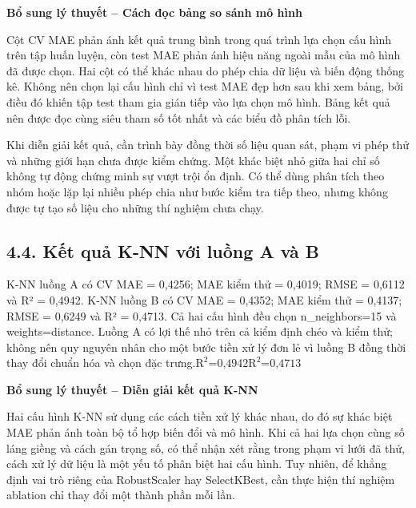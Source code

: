 \documentclass[12pt,a4paper,oneside]{article}
\begin{document}
\par\noindent\textbf{Bổ sung lý thuyết -- Cách đọc bảng so sánh mô hình}\par
Cột CV MAE phản ánh kết quả trung bình trong quá trình lựa chọn cấu hình trên tập huấn luyện, còn test MAE phản ánh hiệu năng ngoài mẫu của mô hình đã được chọn. Hai cột có thể khác nhau do phép chia dữ liệu và biến động thống kê. Không nên chọn lại cấu hình chỉ vì test MAE đẹp hơn sau khi xem bảng, bởi điều đó khiến tập test tham gia gián tiếp vào lựa chọn mô hình. Bảng kết quả nên được đọc cùng siêu tham số tốt nhất và các biểu đồ phân tích lỗi.\par

Khi diễn giải kết quả, cần trình bày đồng thời số liệu quan sát, phạm vi phép thử và những giới hạn chưa được kiểm chứng. Một khác biệt nhỏ giữa hai chỉ số không tự động chứng minh sự vượt trội ổn định. Có thể dùng phân tích theo nhóm hoặc lặp lại nhiều phép chia như bước kiểm tra tiếp theo, nhưng không được tự tạo số liệu cho những thí nghiệm chưa chạy.\par

\subsection*{4.4. Kết quả K-NN với luồng A và B}

K-NN luồng A có CV MAE = 0,4256; MAE kiểm thử = 0,4019; RMSE = 0,6112 và
R² = 0,4942. K-NN luồng B có CV MAE = 0,4352; MAE kiểm thử = 0,4137;
RMSE = 0,6249 và R² = 0,4713. Cả hai cấu hình đều chọn n\_neighbors=15
và weights=distance. Luồng A có lợi thế nhỏ trên cả kiểm định chéo và
kiểm thử; không nên quy nguyên nhân cho một bước tiền xử lý đơn lẻ vì
luồng B đồng thời thay đổi chuẩn hóa và chọn đặc
trưng.\(\text{R}^{\text{2}}\text{=}\text{0}\text{,}\text{4942}\text{R}^{\text{2}}\text{=}\text{0}\text{,}\text{4713}\)


\par\noindent\textbf{Bổ sung lý thuyết -- Diễn giải kết quả K-NN}\par
Hai cấu hình K-NN sử dụng các cách tiền xử lý khác nhau, do đó sự khác biệt MAE phản ánh toàn bộ tổ hợp biến đổi và mô hình. Khi cả hai lựa chọn cùng số láng giềng và cách gán trọng số, có thể nhận xét rằng trong phạm vi lưới đã thử, cách xử lý dữ liệu là một yếu tố phân biệt hai cấu hình. Tuy nhiên, để khẳng định vai trò riêng của RobustScaler hay SelectKBest, cần thực hiện thí nghiệm ablation chỉ thay đổi một thành phần mỗi lần.\par
\end{document}
